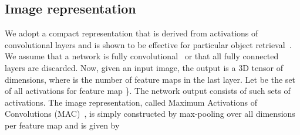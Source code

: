 \documentclass[runningheads]{llncs}
\begin{document}
\subsection{Image representation}
\vspace{-2pt}
We adopt a compact representation that is derived from activations of convolutional layers and is shown to be effective for particular object retrieval~\cite{ARSM+14,TSJ16}.
We assume that a network is fully convolutional~\cite{PKS15} or that all fully connected layers are discarded.
Now, given an input image, the output is a 3D tensor  of  dimensions, where  is the number of feature maps in the last layer. 
Let  be the set of all  activations for feature map \}.
The network output consists of  such sets of activations.
The image representation, called Maximum Activations of Convolutions (MAC)~\cite{RSMC14,TSJ16}, is simply constructed by max-pooling over all dimensions per feature map and is given by
\vspace{-2pt}
\end{document}
